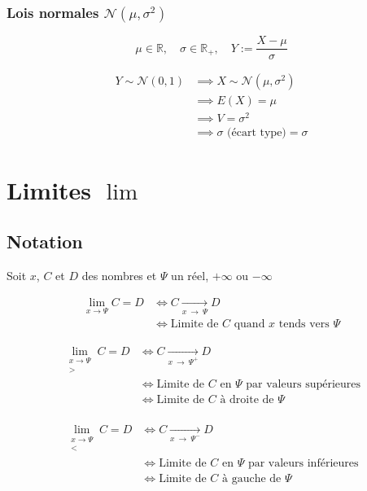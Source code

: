 \documentclass{article}
\newcommand{\R}{\mathds{R}}
\newcommand{\goesto}[2]{\xrightarrow[#1\:\to\:#2]{}}
\begin{document}
\subsubsection{Lois normales $\mathcal N(\mu, \sigma^2)$}

\[
	\mu \in \R,\quad \sigma\in \R_{+},\quad Y := \frac{X-\mu}{\sigma}
\] 

\begin{align*}
	Y \sim \mathcal N(0, 1) &\implies X \sim \mathcal N(\mu, \sigma^2) \\
							&\implies E(X) = \mu \\
							&\implies V = \sigma^2 \\
							&\implies \sigma\text{ (écart type)} = \sigma
\end{align*}

\newpage\section{Limites $\lim$}

\subsection{Notation}

Soit $x$, $C$ et $D$ des nombres et $\Psi$ un réel, $+\infty$ ou $-\infty$

\begin{equation*}
    \begin{split}
        \lim_{x \to \Psi} C = D &\iff C \goesto{x}{\Psi} D \\
        &\iff \text{Limite de $C$ quand $x$ tends vers $\Psi$}
    \end{split}
\end{equation*}

\begin{equation*}
    \begin{split}
        \lim_{\substack{x\to\Psi \\ >}} C = D &\iff C \goesto{x}{\Psi^+} D \\
        &\iff \text{Limite de $C$ en $\Psi$ par valeurs supérieures} \\
        &\iff \text{Limite de $C$ à droite de $\Psi$} \\
    \end{split}
\end{equation*}

\begin{equation*}
    \begin{split}
         \lim_{\substack{x\to\Psi \\ <}} C = D &\iff C \goesto{x}{\Psi^-} D\\
        &\iff \text{Limite de $C$ en $\Psi$ par valeurs inférieures} \\
        &\iff \text{Limite de $C$ à gauche de $\Psi$} \\
    \end{split}
\end{equation*}
\end{document}
